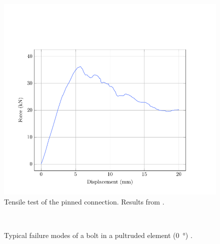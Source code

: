 \begin{figure}[p]
\centering
\begin{fullpage}
	\includegraphics[]{ch3_creteil/plot/6_pin/build.pdf}
	\caption[Tensile test of the pinned connection]{Tensile test of the pinned connection. Results from \cite{Tayeb2015a}.}
	\label{plot:pintest}
\end{fullpage}
\end{figure}

\begin{figure}[p]
     	\centering
	\begin{fullpage}	
		 \\
		\vspace{10pt}
		\caption[Typical failure modes of a bolt in a pultruded element ]{Typical failure modes of a bolt in a pultruded element (\SI{0}{\degree}) \cite{Clarke2003}.}
		\label{fig:breaking}    
	\end{fullpage}
\end{figure}

